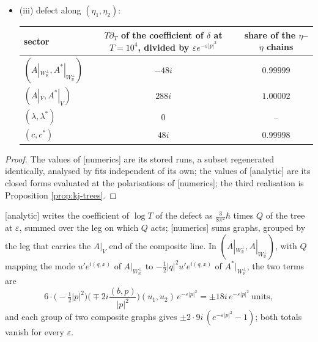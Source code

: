 \begin{proposition}
\begin{itemize}
\item (iii) defect along $(\eta_1,\eta_2)$:
\begin{tabular}{l|c|c}
sector & $T\partial_T$ of the coefficient of $\delta$ at $T=10^4$, divided by $\varepsilon e^{-\varepsilon|p|^2}$ & share of the $\eta$--$\eta$ chains \\
\hline
$(A|_{W_{\mathbb R}^\perp},A^*|_{W_{\mathbb R}^\perp})$ & $-48i$ & $0.99999$ \\
$(A|_V,A^*|_V)$ & $288i$ & $1.00002$ \\
$(\lambda,\lambda^*)$ & $0$ & -- \\
$(c,c^*)$ & $48i$ & $0.99998$ \\
\end{tabular}
\end{itemize}
\end{proposition}

\begin{proof}
The values of [numerics] are its stored runs, a subset regenerated identically, analysed by fits independent of its own; the values of [analytic] are its closed forms evaluated at the polarisations of [numerics]; the third realisation is Proposition \ref{prop:kj-trees}.
\end{proof}

\begin{remark}
\label{rem:kj-split}
[analytic] writes the coefficient of $\log T$ of the defect as $\tfrac{3}{8\pi^2}\hbar$ times $Q$ of the tree at $\varepsilon$, summed over the leg on which $Q$ acts; [numerics] sums graphs, grouped by the leg that carries the $A|_V$ end of the composite line. In $(A|_{W_{\mathbb R}^\perp},A|_{W_{\mathbb R}^\perp})$, with $Q$ mapping the mode $u'e^{i(q,x)}$ of $A|_{W_{\mathbb R}^\perp}$ to $-\tfrac12|q|^2u'e^{i(q,x)}$ of $A^*|_{W_{\mathbb R}^\perp}$, the two terms are
\[
6\cdot\big(-\tfrac12|p|^2\big)\Big(\mp2i\frac{(b,p)}{|p|^2}\Big)(u_1,u_2)\,e^{-\varepsilon|p|^2}=\pm18i\,e^{-\varepsilon|p|^2}\ \text{units},
\]
and each group of two composite graphs gives $\pm2\cdot9i\,(e^{-\varepsilon|p|^2}-1)$; both totals vanish for every $\varepsilon$.
\end{remark}

